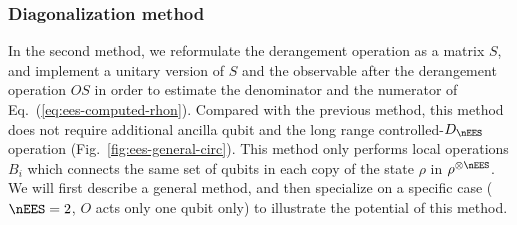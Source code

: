 \subsubsection{Diagonalization method}
\label{sec:derangement-details_diagonalization}
In the second method, we reformulate the derangement operation
as a matrix $S$, and implement a unitary version of
$S$ and the observable after the derangement operation $OS$ in order to
estimate the denominator and the numerator of Eq.~(\ref{eq:ees-computed-rhon}).
Compared with the previous method, this method does not require additional
ancilla qubit and the long range controlled-$D_\nEES$ operation (Fig.~\ref{fig:ees-general-circ}). This method only performs local operations $B_i$ which connects the same set of qubits in each copy of the state $\rho$ in $\rho^{\otimes \nEES}$.
We will first describe a general method, and then specialize on a specific case ($\nEES=2$, $O$ acts only one qubit only)
to illustrate the potential of this method.

